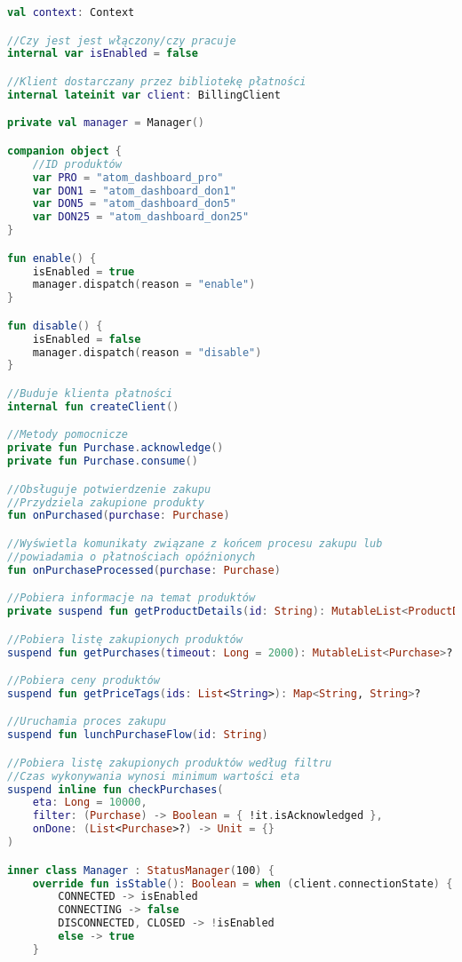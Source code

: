 \begin{lstlisting}[language=Kotlin]
val context: Context

//Czy jest jest włączony/czy pracuje
internal var isEnabled = false

//Klient dostarczany przez bibliotekę płatności
internal lateinit var client: BillingClient

private val manager = Manager()

companion object {
    //ID produktów
    var PRO = "atom_dashboard_pro"
    var DON1 = "atom_dashboard_don1"
    var DON5 = "atom_dashboard_don5"
    var DON25 = "atom_dashboard_don25"
}

fun enable() {
    isEnabled = true
    manager.dispatch(reason = "enable")
}

fun disable() {
    isEnabled = false
    manager.dispatch(reason = "disable")
}

//Buduje klienta płatności
internal fun createClient()

//Metody pomocnicze
private fun Purchase.acknowledge()
private fun Purchase.consume()

//Obsługuje potwierdzenie zakupu
//Przydziela zakupione produkty
fun onPurchased(purchase: Purchase)

//Wyświetla komunikaty związane z końcem procesu zakupu lub
//powiadamia o płatnościach opóźnionych
fun onPurchaseProcessed(purchase: Purchase)

//Pobiera informacje na temat produktów 
private suspend fun getProductDetails(id: String): MutableList<ProductDetails>?

//Pobiera listę zakupionych produktów
suspend fun getPurchases(timeout: Long = 2000): MutableList<Purchase>?

//Pobiera ceny produktów
suspend fun getPriceTags(ids: List<String>): Map<String, String>?

//Uruchamia proces zakupu
suspend fun lunchPurchaseFlow(id: String)

//Pobiera listę zakupionych produktów według filtru
//Czas wykonywania wynosi minimum wartości eta
suspend inline fun checkPurchases(
    eta: Long = 10000,
    filter: (Purchase) -> Boolean = { !it.isAcknowledged },
    onDone: (List<Purchase>?) -> Unit = {}
)

inner class Manager : StatusManager(100) {
    override fun isStable(): Boolean = when (client.connectionState) {
        CONNECTED -> isEnabled
        CONNECTING -> false
        DISCONNECTED, CLOSED -> !isEnabled
        else -> true
    }


\end{lstlisting}
